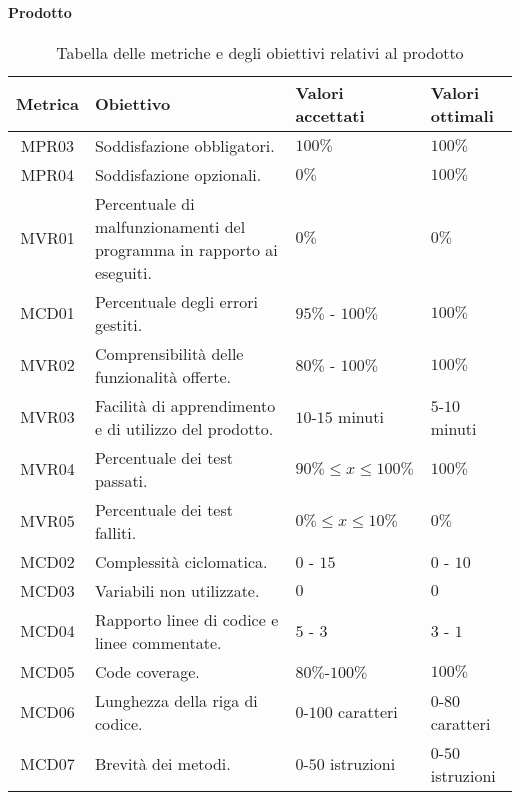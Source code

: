 \paragraph{Prodotto}
\begin{table}[H]
		\begin{center}
			\setlength{\aboverulesep}{0pt}
			\setlength{\belowrulesep}{0pt}
			\setlength{\extrarowheight}{.75ex}
			\begin{tabular}{ c C{6cm} C{3cm} C{3cm} }
				\textbf{Metrica} & \textbf{Obiettivo} & \textbf{Valori accettati} & \textbf{Valori ottimali}  \\
				\toprule
				MPR03 & Soddisfazione  obbligatori. & $100 \%$ & $100 \%$ \\
				MPR04 & Soddisfazione  opzionali. & $ 0 \%$ & $ 100\%$ \\
				MVR01 & Percentuale di malfunzionamenti del programma in rapporto ai  eseguiti. & $ 0\%$  & $0\%$ \\
				MCD01 & Percentuale degli errori gestiti. & $ 95\%$ - $100\% $ & $100\%$ \\
				MVR02 & Comprensibilità delle funzionalità offerte. & $ 80\%$ - $100\% $ & $100\%$ \\
				MVR03 & Facilità di apprendimento e di utilizzo del prodotto. & $10$-$15$ minuti & $5$-$10$ minuti \\
				MVR04 & Percentuale dei test passati. & $90\% \leq x \leq 100\% $& $100\%$ \\
				MVR05 & Percentuale dei test falliti. & $0\% \leq x \leq 10\% $& $0\%$ \\				
				MCD02 & Complessità ciclomatica. & $0$ - $15$ & $0$ - $10$ \\
				MCD03 & Variabili non utilizzate. & $0$ & $0$ \\
				MCD04 & Rapporto linee di codice e linee commentate. & $5$ - $3$ & $3$ - $1$\\
				MCD05 & Code coverage. & $80\%$-$100\%$ & $100\%$ \\
				MCD06 & Lunghezza della riga di codice. & $0$-$100$ caratteri & $0$-$80$ caratteri \\
				MCD07 & Brevità dei metodi. & $0$-$50$ istruzioni & $0$-$50$ istruzioni \\
			\end{tabular}
			\caption{Tabella delle metriche e degli obiettivi relativi al prodotto}
		\end{center}
	\end{table}

